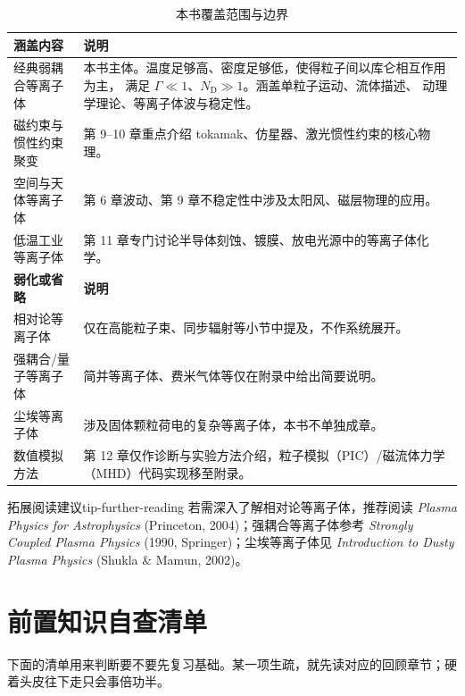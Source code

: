 \documentclass[12pt,a4paper,openany,oneside]{book}
\begin{document}
\begin{table}[htbp]
\centering
\caption{本书覆盖范围与边界}
\begin{tabular}{@{}lp{10cm}@{}}
\toprule
\textbf{涵盖内容} & \textbf{说明} \\
\midrule
经典弱耦合等离子体 & 本书主体。温度足够高、密度足够低，使得粒子间以库仑相互作用为主，
满足 $\Gamma\ll 1$、$N_\mathrm{D}\gg 1$。涵盖单粒子运动、流体描述、
动理学理论、等离子体波与稳定性。 \\
磁约束与惯性约束聚变 & 第 9--10 章重点介绍 tokamak、仿星器、激光惯性约束的核心物理。 \\
空间与天体等离子体 & 第 6 章波动、第 9 章不稳定性中涉及太阳风、磁层物理的应用。 \\
低温工业等离子体 & 第 11 章专门讨论半导体刻蚀、镀膜、放电光源中的等离子体化学。 \\
\midrule
\textbf{弱化或省略} & \textbf{说明} \\
\midrule
相对论等离子体 & 仅在高能粒子束、同步辐射等小节中提及，不作系统展开。 \\
强耦合/量子等离子体 & 简并等离子体、费米气体等仅在附录中给出简要说明。 \\
尘埃等离子体 & 涉及固体颗粒荷电的复杂等离子体，本书不单独成章。 \\
数值模拟方法 & 第 12 章仅作诊断与实验方法介绍，粒子模拟（PIC）/磁流体力学（MHD）代码实现移至附录。 \\
\bottomrule
\end{tabular}
\end{table}

\begin{tip}{拓展阅读建议}{tip-further-reading}
若需深入了解相对论等离子体，推荐阅读 \textit{Plasma Physics for Astrophysics}
(Princeton, 2004)；强耦合等离子体参考 \textit{Strongly Coupled Plasma Physics}
(1990, Springer)；尘埃等离子体见 \textit{Introduction to Dusty Plasma Physics}
(Shukla \& Mamun, 2002)。
\end{tip}


\section*{前置知识自查清单}
{}

下面的清单用来判断要不要先复习基础。某一项生疏，就先读对应的回顾章节；硬着头皮往下走只会事倍功半。
\end{document}
